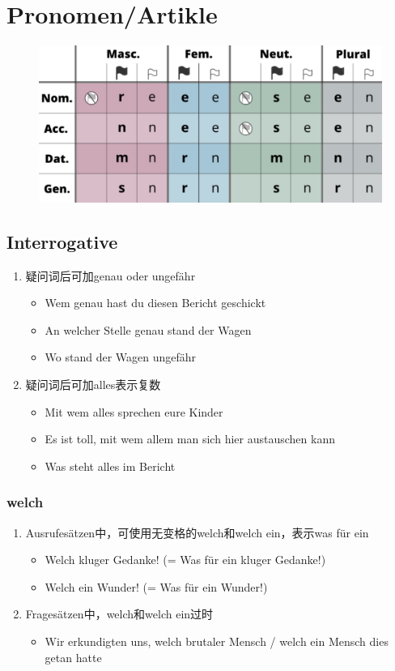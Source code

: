 \documentclass[UTF8]{report}
\begin{document}
\chapter{Pronomen/Artikle}
\begin{figure}[H]
    \centering
    \includegraphics[scale=0.4]{dc.png}
\end{figure}
\section{Interrogative}
\begin{enumerate}
    \item 疑问词后可加genau oder ungefähr
    \begin{itemize}
        \item Wem genau hast du diesen Bericht geschickt
        \item An welcher Stelle genau stand der Wagen
        \item Wo stand der Wagen ungefähr
    \end{itemize}
    \item 疑问词后可加alles表示复数
    \begin{itemize}
        \item Mit wem alles sprechen eure Kinder
        \item Es ist toll, mit wem allem man sich hier austauschen kann
        \item Was steht alles im Bericht
    \end{itemize}
\end{enumerate}

\subsection{welch}
\begin{enumerate}
    \item Ausrufesätzen中，可使用无变格的welch和welch ein，表示was für ein
    \begin{itemize}
        \item Welch kluger Gedanke! (= Was für ein kluger Gedanke!)
        \item Welch ein Wunder! (= Was für ein Wunder!)
    \end{itemize}
    \item Fragesätzen中，welch和welch ein过时
    \begin{itemize}
        \item Wir erkundigten uns, welch brutaler Mensch / welch ein Mensch dies getan hatte
    \end{itemize}
\end{enumerate}
\end{document}
